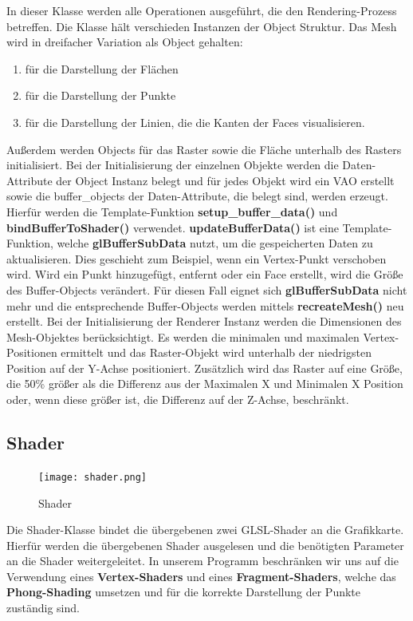 \noindent In dieser Klasse werden alle Operationen ausgeführt, die den Rendering-Prozess betreffen. Die Klasse hält verschieden Instanzen der Object Struktur. Das Mesh wird in dreifacher Variation als Object gehalten:
\begin{enumerate}
\item für die Darstellung der Flächen
\item für die Darstellung der Punkte
\item für die Darstellung der Linien, die die Kanten der Faces visualisieren.
\end{enumerate}
Außerdem werden Objects für das Raster sowie die Fläche unterhalb des Rasters initialisiert.\newline
Bei der Initialisierung der einzelnen Objekte werden die Daten-Attribute der Object Instanz belegt und für jedes Objekt wird ein VAO erstellt sowie die buffer\_objects der Daten-Attribute, die belegt sind, werden erzeugt. Hierfür werden die Template-Funktion \textbf{setup\_buffer\_data()} und \textbf{bindBufferToShader()} verwendet. \textbf{updateBufferData()} ist eine Template-Funktion, welche \textbf{glBufferSubData} nutzt, um die gespeicherten Daten zu aktualisieren. Dies geschieht zum Beispiel, wenn ein Vertex-Punkt verschoben wird. Wird ein Punkt hinzugefügt, entfernt oder ein Face erstellt, wird die Größe des Buffer-Objects verändert. Für diesen Fall eignet sich \textbf{glBufferSubData} nicht mehr und die entsprechende Buffer-Objects werden mittels \textbf{recreateMesh()} neu erstellt.\newline
Bei der Initialisierung der Renderer Instanz werden die Dimensionen des Mesh-Objektes berücksichtigt. Es werden die minimalen und maximalen Vertex-Positionen ermittelt und das Raster-Objekt wird unterhalb der niedrigsten Position auf der Y-Achse positioniert. Zusätzlich wird das Raster auf eine Größe, die 50\% größer als die Differenz aus der Maximalen X und Minimalen X Position oder, wenn diese größer ist, die Differenz auf der Z-Achse, beschränkt.

\subsection{Shader}

\begin{figure}[H]
\centering
\texttt{[image: shader.png]}
\caption{Shader}
\label{fig7}
\end{figure}

\noindent Die Shader-Klasse bindet die übergebenen zwei GLSL-Shader an die Grafikkarte. Hierfür werden die übergebenen Shader ausgelesen und die benötigten Parameter an die Shader weitergeleitet. In unserem Programm beschränken wir uns auf die Verwendung eines \textbf{Vertex-Shaders} und eines \textbf{Fragment-Shaders}, welche das \textbf{Phong-Shading} umsetzen und für die korrekte Darstellung der Punkte zuständig sind.

